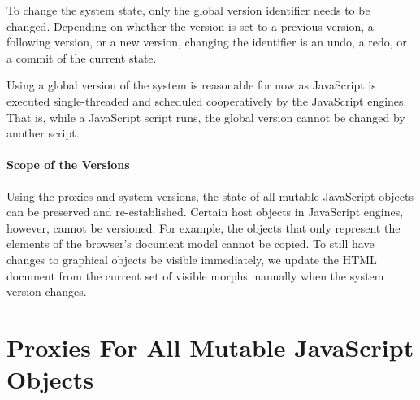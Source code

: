 To change the system state, only the global version identifier needs to be changed.
Depending on whether the version is set to a previous version, a following version, or a new version, changing the identifier is an undo, a redo, or a commit of the current state.

Using a global version of the system is reasonable for now as JavaScript is executed single-threaded and scheduled cooperatively by the JavaScript engines.
That is, while a JavaScript script runs, the global version cannot be changed by another script.

\paragraph{Scope of the Versions}
Using the proxies and system versions, the state of all mutable JavaScript objects can be preserved and re-established.
Certain host objects in JavaScript engines, however, cannot be versioned.
For example, the objects that only represent the elements of the browser's document model cannot be copied.
To still have changes to graphical objects be visible immediately, we update the HTML document from the current set of visible morphs manually when the system version changes.


\section{Proxies For All Mutable JavaScript Objects}

